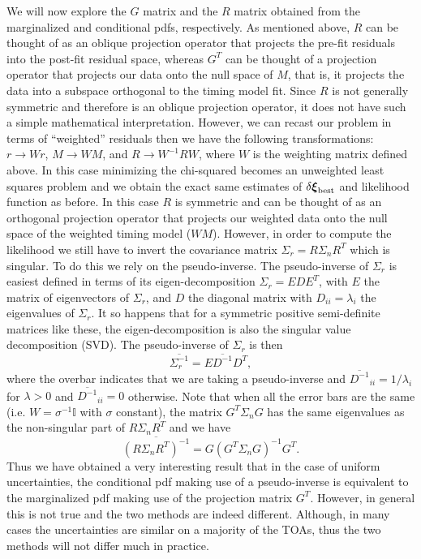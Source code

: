 \documentclass[iop]{emulateapj} \usepackage{apjfonts}
\newcommand{\be}{\begin{equation}} \newcommand{\ee}{\end{equation}}
\begin{document}
We will now explore the $G$ matrix and the $R$ matrix obtained from
the marginalized and conditional pdfs, respectively. As mentioned
above, $R$ can be thought of as an oblique projection operator that
projects the pre-fit residuals into the post-fit residual space,
whereas $G^{T}$ can be thought of a projection operator that projects
our data onto the null space of $M$, that is, it projects the data
into a subspace orthogonal to the timing model fit. Since $R$ is not
generally symmetric and therefore is an oblique projection operator,
it does not have such a simple mathematical interpretation. However,
we can recast our problem in terms of ``weighted'' residuals then we
have the following transformations: $r\rightarrow Wr$, $M\rightarrow
WM$, and $R\rightarrow W^{-1}RW$, where $W$ is the weighting matrix
defined above. In this case minimizing the chi-squared becomes an
unweighted least squares problem and we obtain the exact same
estimates of $\delta\boldsymbol{\xi}_{\rm best}$ and likelihood
function as before. In this case $R$ is symmetric and can be thought
of as an orthogonal projection operator that projects our weighted
data onto the null space of the weighted timing model ($WM$). However,
in order to compute the likelihood we still have to invert the
covariance matrix $\Sigma_{r}=R\Sigma_{n}R^{T}$ which is singular. To
do this we rely on the pseudo-inverse. The pseudo-inverse of
$\Sigma_{r}$ is easiest defined in terms of its eigen-decomposition
$\Sigma_{r}=EDE^{T}$, with $E$ the matrix of eigenvectors of
$\Sigma_{r}$, and $D$ the diagonal matrix with $D_{ii}=\lambda_{i}$
the eigenvalues of $\Sigma_{r}$. It so happens that for a symmetric
positive semi-definite matrices like these, the eigen-decomposition is
also the singular value decomposition (SVD). The pseudo-inverse of
$\Sigma_{r}$ is then \be
\overline{\Sigma_{r}^{-1}}=E\overline{D^{-1}}D^{T}, \ee where the
overbar indicates that we are taking a pseudo-inverse and
$\overline{D^{-1}}_{ii}=1/\lambda_{i}$ for $\lambda>0$ and
$\overline{D^{-1}}_{ii}=0$ otherwise. Note that when all the error
bars are the same (i.e. $W=\sigma^{-1}\mathbb{I}$ with $\sigma$
constant), the matrix $G^{T}\Sigma_{n}G$ has the same eigenvalues as
the non-singular part of $R\Sigma_{n}R^{T}$ and we have \be
\overline{(R\Sigma_{n}R^{T})^{-1}}=G(G^{T}\Sigma_{n}G)^{-1}G^{T}. \ee
Thus we have obtained a very interesting result that in the case of
uniform uncertainties, the conditional pdf making use of a
pseudo-inverse is equivalent to the marginalized pdf making use of the
projection matrix $G^{T}$. However, in general this is not true and
the two methods are indeed different. Although, in many cases the
uncertainties are similar on a majority of the TOAs, thus the two
methods will not differ much in practice.






 
\end{document}
